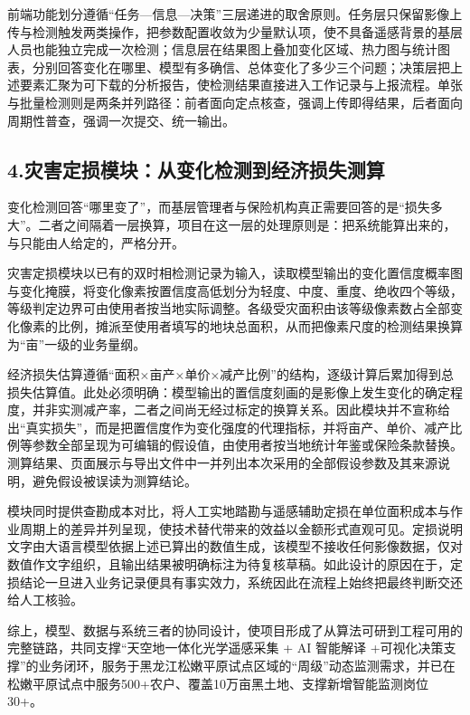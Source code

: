 \documentclass[12pt, a4paper]{ctexart}
\begin{document}
前端功能划分遵循“任务—信息—决策”三层递进的取舍原则。任务层只保留影像上传与检测触发两类操作，把参数配置收敛为少量默认项，使不具备遥感背景的基层人员也能独立完成一次检测；信息层在结果图上叠加变化区域、热力图与统计图表，分别回答变化在哪里、模型有多确信、总体变化了多少三个问题；决策层把上述要素汇聚为可下载的分析报告，使检测结果直接进入工作记录与上报流程。单张与批量检测则是两条并列路径：前者面向定点核查，强调上传即得结果，后者面向周期性普查，强调一次提交、统一输出。

\subsection{4.灾害定损模块：从变化检测到经济损失测算}

变化检测回答“哪里变了”，而基层管理者与保险机构真正需要回答的是“损失多大”。二者之间隔着一层换算，项目在这一层的处理原则是：把系统能算出来的，与只能由人给定的，严格分开。

灾害定损模块以已有的双时相检测记录为输入，读取模型输出的变化置信度概率图与变化掩膜，将变化像素按置信度高低划分为轻度、中度、重度、绝收四个等级，等级判定边界可由使用者按当地实际调整。各级受灾面积由该等级像素数占全部变化像素的比例，摊派至使用者填写的地块总面积，从而把像素尺度的检测结果换算为“亩”一级的业务量纲。

经济损失估算遵循“面积×亩产×单价×减产比例”的结构，逐级计算后累加得到总损失估算值。此处必须明确：模型输出的置信度刻画的是影像上发生变化的确定程度，并非实测减产率，二者之间尚无经过标定的换算关系。因此模块并不宣称给出“真实损失”，而是把置信度作为变化强度的代理指标，并将亩产、单价、减产比例等参数全部呈现为可编辑的假设值，由使用者按当地统计年鉴或保险条款替换。测算结果、页面展示与导出文件中一并列出本次采用的全部假设参数及其来源说明，避免假设被误读为测算结论。

模块同时提供查勘成本对比，将人工实地踏勘与遥感辅助定损在单位面积成本与作业周期上的差异并列呈现，使技术替代带来的效益以金额形式直观可见。定损说明文字由大语言模型依据上述已算出的数值生成，该模型不接收任何影像数据，仅对数值作文字组织，且输出结果被明确标注为待复核草稿。如此设计的原因在于，定损结论一旦进入业务记录便具有事实效力，系统因此在流程上始终把最终判断交还给人工核验。

综上，模型、数据与系统三者的协同设计，使项目形成了从算法可研到工程可用的完整链路，共同支撑“天空地一体化光学遥感采集 + AI 智能解译 +可视化决策支撑”的业务闭环，服务于黑龙江松嫩平原试点区域的“周级”动态监测需求，并已在松嫩平原试点中服务500+农户、覆盖10万亩黑土地、支撑新增智能监测岗位30+。

\end{document}
